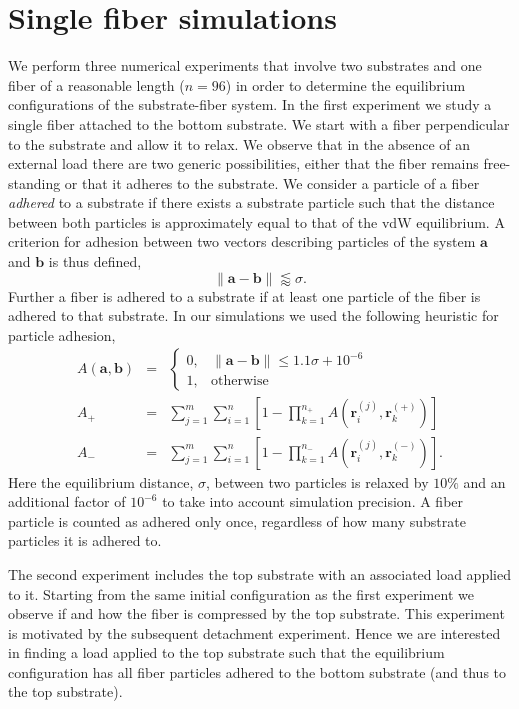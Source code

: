 \chapter{Single fiber simulations} \label{chap:three}

We perform three numerical experiments that involve two substrates and one fiber of a reasonable length ($n=96$) in order to determine the equilibrium configurations of the substrate-fiber system. In the first experiment we study a single fiber attached to the bottom substrate. We start with a fiber perpendicular to the substrate and allow it to relax. We observe that in the absence of an external load there are two generic possibilities, either that the fiber remains free-standing or that it adheres to the substrate. We consider a particle of a fiber \textit{adhered} to a substrate if there exists a substrate particle such that the distance between both particles is approximately equal to that of the vdW equilibrium. A criterion for adhesion between two vectors describing particles of the system $\textbf{a}$ and $\textbf{b}$ is thus defined, 
\begin{equation} \label{eqn:criterion}
	\|\textbf{a} - \textbf{b}\| \lessapprox \sigma.
\end{equation}
Further a fiber is adhered to a substrate if at least one particle of the fiber is adhered to that substrate. In our simulations we used the following heuristic for particle adhesion, 
\begin{eqnarray} \label{eqn:adhesion}
	A(\textbf{a}, \textbf{b}) &=& \left\{ 
		\begin{array}{ll}
			0, & \|\textbf{a} - \textbf{b}\| \leq 1.1 \sigma + 10^{-6}\\
			1, & \mbox{otherwise}
		\end{array}
		\right.  \\
	A_+ &=& \sum_{j=1}^{m} \sum_{i=1}^{n} \left[ 1 - \prod_{k=1}^{n_+} A(\textbf{r}_i^{(j)},\textbf{r}_k^{(+)}) \right] \label{eqn:adhesion:top} \\ 
	A_- &=& \sum_{j=1}^{m} \sum_{i=1}^{n} \left[ 1 - \prod_{k=1}^{n_-} A(\textbf{r}_i^{(j)},\textbf{r}_k^{(-)}) \right]. \label{eqn:adhesion:bottom}
\end{eqnarray}
Here the equilibrium distance, $\sigma$, between two particles is relaxed by $10\%$ and an additional factor of $10^{-6}$ to take into account simulation precision. A fiber particle is counted as adhered only once, regardless of how many substrate particles it is adhered to.

The second experiment includes the top substrate with an associated load applied to it. Starting from the same initial configuration as the first experiment we observe if and how the fiber is compressed by the top substrate. This experiment is motivated by the subsequent detachment experiment. Hence we are interested in finding a load applied to the top substrate such that the equilibrium configuration has all fiber particles adhered to the bottom substrate (and thus to the top substrate).


